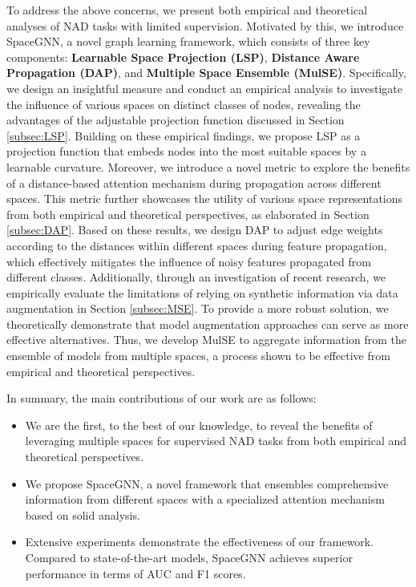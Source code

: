 To address the above concerns, we present both empirical and theoretical analyses of NAD tasks with limited supervision. Motivated by this, we introduce SpaceGNN, a novel graph learning framework, which consists of three key components: {\bf Learnable Space Projection (LSP)}, {\bf Distance Aware Propagation (DAP)}, and {\bf Multiple Space Ensemble ({\update MulSE})}. Specifically, we design an insightful measure and conduct an empirical analysis to investigate the influence of various spaces on distinct classes of nodes, revealing the advantages of the adjustable projection function discussed in Section \ref{subsec:LSP}. Building on these empirical findings, we propose LSP as a projection function that embeds nodes into the most suitable spaces by a learnable curvature. Moreover, we introduce a novel metric to explore the benefits of a distance-based attention mechanism during propagation across different spaces. This metric further showcases the utility of various space representations from both empirical and theoretical perspectives, as elaborated in Section \ref{subsec:DAP}. Based on these results, we design DAP to adjust edge weights according to the distances within different spaces during feature propagation, which effectively mitigates the influence of noisy features propagated from different classes. Additionally, through an investigation of recent research, we empirically evaluate the limitations of relying on synthetic information via data augmentation in Section \ref{subsec:MSE}. To provide a more robust solution, we theoretically demonstrate that model augmentation approaches can serve as more effective alternatives. Thus, we develop {\update MulSE} to aggregate information from the ensemble of models from multiple spaces, a process shown to be effective from empirical and theoretical perspectives. 


In summary, the main contributions of our work are as follows: 
\begin{itemize}[topsep=0.5mm, partopsep=0pt, itemsep=0pt, leftmargin=10pt]
    \item We are the first, to the best of our knowledge, to reveal the benefits of leveraging multiple spaces for supervised NAD tasks from both empirical and theoretical perspectives. 
    \item We propose SpaceGNN, a novel framework that ensembles comprehensive information from different spaces with a specialized attention mechanism based on solid analysis. 
     \item Extensive experiments demonstrate the effectiveness of our framework. Compared to state-of-the-art models, SpaceGNN achieves superior performance in terms of AUC and F1 scores. 
 \end{itemize}



